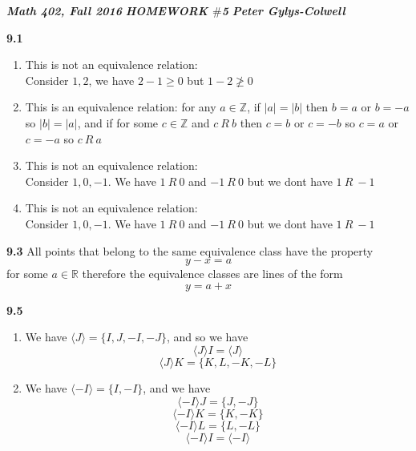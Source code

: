 \documentclass[12pt]{article}
\newenvironment{ques}{\vspace{2 ex}}{\vspace{2 ex}}
\theoremstyle{definition}
\begin{document}
\noindent \textit{\textbf{Math 402, Fall 2016}} \hspace{1.3cm}
\textit{\textbf{HOMEWORK $\#$5}} \hspace{1.3cm} \textit{\textbf{Peter
Gylys-Colwell}} 

\vspace{1cm}

\begin{ques}
	\textbf{9.1} 
		\begin{enumerate}
			\item
				This is not an equivalence relation:\\ 
				Consider $1, 2$, we have $2 - 1 \geq 0$ but $1
				- 2 \not \geq 0$
			\item
				This is an equivalence relation: for any $a \in
				\mathbb{Z}$, if $|a| = |b|$ then $b = a$ or $b
				= -a$ so $|b| = |a|$, and if for some $c \in
				\mathbb{Z}$ and $c\ R\ b$ then $c = b$ or $c = -b$
				so $c = a$ or $c = -a$ so $c\ R\ a$
			\item
				This is not an equivalence relation:\\
				Consider $1, 0, -1$. We have $1\ R\ 0$ and $-1\
				R\ 0$ but we dont have $1\ R\ -1$
			\item
				This is not an equivalence relation:\\
				Consider $1, 0, -1$. We have $1\ R\ 0$ and $-1\
				R\ 0$ but we dont have $1\ R\ -1$
		\end{enumerate}
\end{ques}

\begin{ques}
	\textbf{9.3}
		All points that belong to the same equivalence class have the property
		$$y - x = a$$
		for some $a \in \mathbb{R}$ therefore the equivalence classes
		are lines of the form
		$$y = a + x$$
\end{ques}

\begin{ques}
	\textbf{9.5}
		\begin{enumerate}
			\item
				We have $\langle J\rangle  = \{I, J, -I, -J\}$, and so we have
				$$\langle J\rangle I = \langle J\rangle$$
				$$\langle J\rangle K = \{K, L, -K, -L\}$$
			\item
				We have $\langle -I\rangle  = \{I, -I\}$, and we have
				$$\langle -I\rangle  J = \{J, -J\}$$
				$$\langle -I\rangle  K = \{K, -K\}$$
				$$\langle -I\rangle  L = \{L, -L\}$$
				$$\langle -I\rangle  I = \langle -I\rangle$$
		\end{enumerate}

\end{ques}
\end{document}
